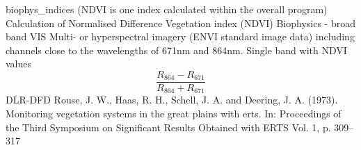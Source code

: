 %
{ %
biophys\_indices (NDVI is one index calculated within the overall program)
}
%
{ %
Calculation of Normalised Difference Vegetation index (NDVI)
}
%
{ %
Biophysics - broad band VIS
}
%
{ %
Multi- or hyperspectral imagery (ENVI standard image data) including channels close to the wavelengths of 671nm and 864nm.\bigskip
}
%
{ %
Single band with NDVI values
}
%
{ %
\begin{displaymath}
 \frac{R_{864}-R_{671}}{R_{864}+R_{671}}
\end{displaymath}
}
%
{ %
DLR-DFD
}
%
{ %
Rouse, J. W., Haas, R. H., Schell, J. A. and Deering, J. A. (1973). Monitoring vegetation systems in the great plains with erts. In: Proceedings of the Third Symposium on Significant Results Obtained with ERTS  Vol. 1, p. 309–317
}


